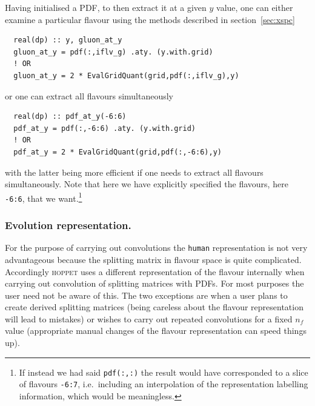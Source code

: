 \documentclass[12pt]{article}
\newcommand{\ie}{i.e.\ }
\newcommand{\hoppet}{\textsc{hoppet}\xspace}
\newcommand{\ttt}[1]{\texttt{#1}}
\begin{document}
Having initialised a PDF, to then extract it at a given $y$ value, one
can either examine a particular flavour using the methods described in
section~\ref{sec:xspc}
\begin{verbatim}
  real(dp) :: y, gluon_at_y
  gluon_at_y = pdf(:,iflv_g) .aty. (y.with.grid)
  ! OR
  gluon_at_y = 2 * EvalGridQuant(grid,pdf(:,iflv_g),y) 
\end{verbatim}
or one can extract all flavours simultaneously
\begin{verbatim}
  real(dp) :: pdf_at_y(-6:6)
  pdf_at_y = pdf(:,-6:6) .aty. (y.with.grid)
  ! OR
  pdf_at_y = 2 * EvalGridQuant(grid,pdf(:,-6:6),y) 
\end{verbatim}
with the latter being more efficient if one needs to extract all
flavours simultaneously. Note that here we have explicitly specified
the flavours, here \ttt{-6:6}, that we want.\footnote{If instead we had
  said \ttt{pdf(:,:)} the result would have corresponded to a slice of
  flavours \ttt{-6:7}, \ie including an interpolation of the
  representation labelling information, which would be meaningless.}


\subsubsection{Evolution representation.} 
\label{sec:evln-rep}
%
For the purpose of carrying out convolutions the \ttt{human}
representation is not very advantageous because the splitting matrix
in flavour space is quite complicated. Accordingly \hoppet uses a
different representation of the flavour internally when carrying out
convolution of splitting matrices with PDFs. For most purposes the
user need not be aware of this. The two exceptions are when a user
plans to create derived splitting matrices (being careless about the
flavour representation will lead to mistakes) or wishes to carry out
repeated convolutions for a fixed $n_f$ value (appropriate manual
changes of the flavour representation can speed things up).
\end{document}
